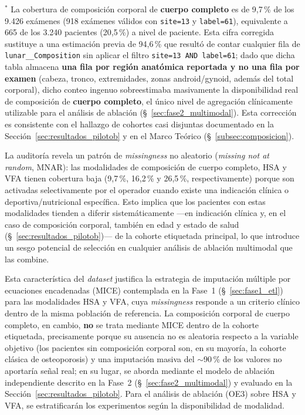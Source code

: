 \documentclass[../tesis.tex]{subfiles}
\begin{document}
$^{*}$ La cobertura de composición corporal de \textbf{cuerpo completo} es de 9{,}7\,\% de los 9.426 exámenes (918 exámenes válidos con \texttt{site=13} y \texttt{label=61}), equivalente a 665 de los 3.240 pacientes (20{,}5\,\%) a nivel de paciente. Esta cifra corregida sustituye a una estimación previa de 94{,}6\,\% que resultó de contar cualquier fila de \texttt{lunar\_\_Composition} sin aplicar el filtro \texttt{site=13 AND label=61}; dado que dicha tabla almacena \textbf{una fila por región anatómica reportada y no una fila por examen} (cabeza, tronco, extremidades, zonas android/gynoid, además del total corporal), dicho conteo ingenuo sobreestimaba masivamente la disponibilidad real de composición de \textbf{cuerpo completo}, el único nivel de agregación clínicamente utilizable para el análisis de ablación (§~\ref{sec:fase2_multimodal}). Esta corrección es consistente con el hallazgo de cohortes casi disjuntas documentado en la Sección~\ref{sec:resultados_pilotob} y en el Marco Teórico (§~\ref{subsec:composicion}).

La auditoría revela un patrón de \textit{missingness} no aleatorio (\textit{missing not at random}, MNAR): las modalidades de composición de cuerpo completo, HSA y VFA tienen cobertura baja (9{,}7\,\%, 16{,}2\,\% y 26{,}5\,\%, respectivamente) porque son activadas selectivamente por el operador cuando existe una indicación clínica o deportiva/nutricional específica. Esto implica que los pacientes con estas modalidades tienden a diferir sistemáticamente ---en indicación clínica y, en el caso de composición corporal, también en edad y estado de salud (§~\ref{sec:resultados_pilotob})--- de la cohorte etiquetada principal, lo que introduce un sesgo potencial de selección en cualquier análisis de ablación multimodal que las combine.

Esta característica del \textit{dataset} justifica la estrategia de imputación múltiple por ecuaciones encadenadas (MICE) contemplada en la Fase~1 (§~\ref{sec:fase1_etl}) para las modalidades HSA y VFA, cuya \textit{missingness} responde a un criterio clínico dentro de la misma población de referencia. La composición corporal de cuerpo completo, en cambio, \textbf{no} se trata mediante MICE dentro de la cohorte etiquetada, precisamente porque su ausencia no es aleatoria respecto a la variable objetivo (los pacientes sin composición corporal son, en su mayoría, la cohorte clásica de osteoporosis) y una imputación masiva del $\sim$90\,\% de los valores no aportaría señal real; en su lugar, se aborda mediante el modelo de ablación independiente descrito en la Fase~2 (§~\ref{sec:fase2_multimodal}) y evaluado en la Sección~\ref{sec:resultados_pilotob}. Para el análisis de ablación (OE3) sobre HSA y VFA, se estratificarán los experimentos según la disponibilidad de modalidad.
\end{document}
